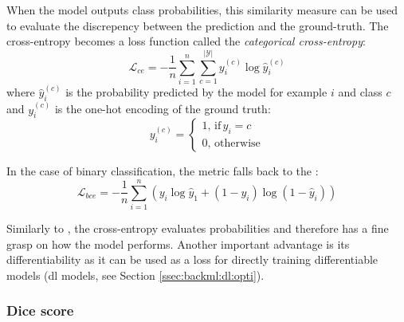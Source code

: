 When the model outputs class probabilities, this similarity measure can be used to evaluate the discrepency between the prediction and the ground-truth. The cross-entropy becomes a loss function called the \textit{categorical cross-entropy}:
\begin{equation}
\label{eqn:backml:crossentropyloss}
\mathcal{L}_{ce} = - \frac{1}{n} \sum\limits_{i=1}^n \sum\limits_{c=1}^{\left|\mathcal{Y}\right|} y^{(c)}_{i} \log \hat{y}^{(c)}_i
\end{equation}
where $\hat{y}^{(c)}_i$ is the probability predicted by the model for example $i$ and class $c$ and $y^{(c)}_i$ is the one-hot encoding of the ground truth:
\begin{equation}
\label{eqn:backml:onehotencoding}
y^{(c)}_i = 
\begin{cases}
1,\,\text{if}\, y_i = c \\
0,\,\text{otherwise}
\end{cases}
\end{equation} 

In the case of binary classification, the metric falls back to the :
\begin{equation}
\label{eqn:backml:bce}
\mathcal{L}_{bce} = - \frac{1}{n} \sum\limits_{i=1}^n \left(y_i \log \hat{y}_1 + (1 - y_i) \log (1 - \hat{y}_i)\right) 
\end{equation} 

Similarly to \rocauc, the cross-entropy evaluates probabilities and therefore has a fine grasp on how the model performs. Another important advantage is its differentiability as it can be used as a loss for directly training differentiable models (\eg \acrlong{dl} models, see Section \ref{ssec:backml:dl:opti}).

\subsubsection{Dice score}
\label{sssec:backml:metric:dice}

